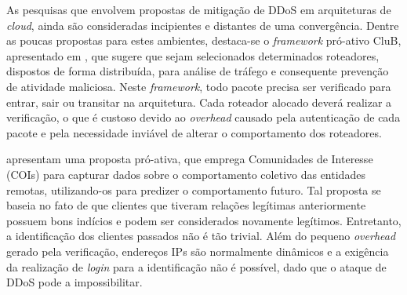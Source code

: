 

As pesquisas que envolvem propostas de mitigação de DDoS em arquiteturas de \emph{cloud}, ainda são consideradas incipientes e distantes de uma convergência. Dentre as poucas propostas para estes ambientes, destaca-se o \emph{framework} pró-ativo CluB, apresentado em \cite{Hazelhurst:2008:SCU:1456659.1456671}, que %
sugere
que sejam selecionados determinados roteadores, dispostos de forma distribuída, para análise de tráfego e consequente prevenção de atividade maliciosa. %
Neste \emph{framework}, todo pacote%
 precisa ser verificado para entrar, sair ou transitar na arquitetura. Cada roteador alocado deverá realizar a verificação, o que é custoso devido ao \emph{overhead} causado pela autenticação de cada pacote e pela necessidade inviável de alterar o comportamento dos roteadores. %

\cite{Verkaik:2006:PCD:1162666.1162673} apresentam uma proposta pró-ativa, que emprega Comunidades de Interesse (COIs) para capturar dados sobre o comportamento coletivo das entidades remotas, utilizando-os para predizer o comportamento futuro. Tal proposta se baseia no fato de que clientes que tiveram relações legítimas anteriormente possuem bons indícios e podem ser considerados novamente legítimos. %
%
Entretanto, a identificação dos clientes passados não é tão trivial. Além do pequeno \emph{overhead} gerado pela verificação, endereços IPs são normalmente dinâmicos e a exigência da realização de \emph{login} para a identificação não é possível, dado que o ataque de DDoS pode a impossibilitar.


